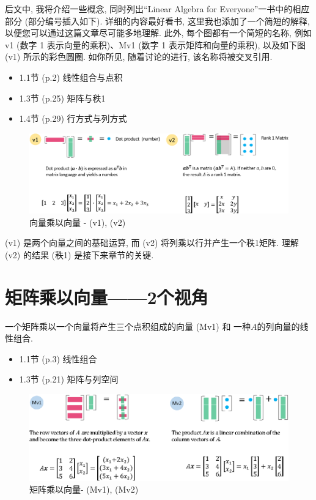 \documentclass[letterpaper]{article}
\begin{document}
后文中, 我将介绍一些概念, 同时列出“Linear Algebra for Everyone”一书中的相应部分 (部分编号插入如下). 
详细的内容最好看书, 这里我也添加了一个简短的解释, 以便您可以通过这篇文章尽可能多地理解. 
此外, 每个图都有一个简短的名称, 例如 v1 (数字 1 表示向量的乘积)、Mv1 (数字 1 表示矩阵和向量的乘积), 以及如下图 (v1) 所示的彩色圆圈. 
如你所见, 随着讨论的进行, 该名称将被交叉引用. 

\begin{itemize}
  \item 1.1节 (p.2) 线性组合与点积
  \item 1.3节 (p.25) 矩阵与秩1
  \item 1.4节 (p.29) 行方式与列方式
\end{itemize}

\begin{figure}[H]
  \centering
  \includegraphics[scale=0.8]{VectorTimesVector.eps}
  \caption{向量乘以向量 - (v1), (v2)}
\end{figure}

(v1) 是两个向量之间的基础运算, 而 (v2) 将列乘以行并产生一个秩1矩阵. 
理解 (v2) 的结果 (秩1) 是接下来章节的关键.

\section{矩阵乘以向量——2个视角}

一个矩阵乘以一个向量将产生三个点积组成的向量 (Mv1) 和
一种$A$的列向量的线性组合.

\begin{itemize}
  \item 1.1节 (p.3) 线性组合
  \item 1.3节 (p.21) 矩阵与列空间
\end{itemize} 

\begin{figure}[H]
  \centering
  \includegraphics[scale=0.8]{MatrixTimesVector.eps}
  \caption{矩阵乘以向量- (Mv1), (Mv2)}
\end{figure}
\end{document}
